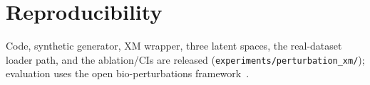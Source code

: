 \documentclass{article}
\begin{document}
\section*{Reproducibility}
Code, synthetic generator, XM wrapper, three latent spaces, the real-dataset
loader path, and the ablation/CIs are released (\texttt{experiments/perturbation\_xm/});
evaluation uses the open bio-perturbations framework~\citep{bioperturbations}.



\end{document}
